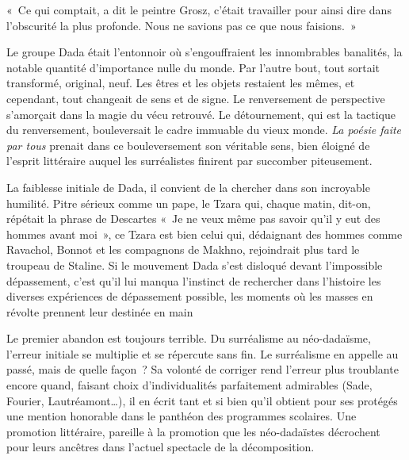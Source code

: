 \documentclass[french,twoside]{book} %
\newcommand{\astermono}{\medskip\centerline{\color{rubric}\large\selectfont{\syms ✻}}\medskip\par}%
\newenvironment{quoteblock}%
  {\begin{quoting}}
  {\end{quoting}}
\newenvironment{quotebar}{%
    \def\FrameCommand{{\color{rubric!10!}\vrule width 0.5em} \hspace{0.9em}}%
    \def\OuterFrameSep{\itemsep} %
    \MakeFramed {\advance\hsize-\width \FrameRestore}
  }%
  {%
    \endMakeFramed
  }
\renewenvironment{quoteblock}%
  {%
    \savenotes
    \setstretch{0.9}
    \normalfont
    \begin{quotebar}
  }
  {%
    \end{quotebar}
    \spewnotes
  }
\begin{document}
\begin{quoteblock}
\noindent « Ce qui comptait, a dit le peintre Grosz, c’était travailler pour ainsi dire dans l’obscurité la plus profonde. Nous ne savions pas ce que nous faisions. »\end{quoteblock}

\noindent Le groupe Dada était l’entonnoir où s’engouffraient les innombrables banalités, la notable quantité d’importance nulle du monde. Par l’autre bout, tout sortait transformé, original, neuf. Les êtres et les objets restaient les mêmes, et cependant, tout changeait de sens et de signe. Le renversement de perspective s’amorçait dans la magie du vécu retrouvé. Le détournement, qui est la tactique du renversement, bouleversait le cadre immuable du vieux monde. \emph{La poésie faite par tous} prenait dans ce bouleversement son véritable sens, bien éloigné de l’esprit littéraire auquel les surréalistes finirent par succomber piteusement.\par
La faiblesse initiale de Dada, il convient de la chercher dans son incroyable humilité. Pitre sérieux comme un pape, le Tzara qui, chaque matin, dit-on, répétait la phrase de Descartes « Je ne veux même pas savoir qu’il y eut des hommes avant moi », ce Tzara est bien celui qui, dédaignant des hommes comme Ravachol, Bonnot et les compagnons de Makhno, rejoindrait plus tard le troupeau de Staline. Si le mouvement Dada s’est disloqué devant l’impossible dépassement, c’est qu’il lui manqua l’instinct de rechercher dans l’histoire les diverses expériences de dépassement possible, les moments où les masses en révolte prennent leur destinée en main\par
Le premier abandon est toujours terrible. Du surréalisme au néo-dadaïsme, l’erreur initiale se multiplie et se répercute sans fin. Le surréalisme en appelle au passé, mais de quelle façon ? Sa volonté de corriger rend l’erreur plus troublante encore quand, faisant choix d’individualités parfaitement admirables (Sade, Fourier, Lautréamont…), il en écrit tant et si bien qu’il obtient pour ses protégés une mention honorable dans le panthéon des programmes scolaires. Une promotion littéraire, pareille à la promotion que les néo-dadaïstes décrochent pour leurs ancêtres dans l’actuel spectacle de la décomposition.\par

\astermono
\end{document}
